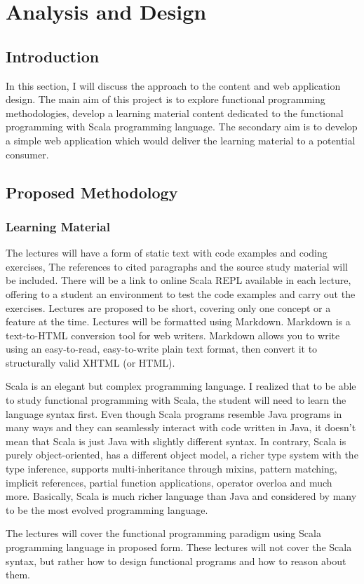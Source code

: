 \documentclass[12pt,twoside,a4paper]{report}
\begin{document}
\chapter{Analysis and Design}\label{3}

\section{Introduction}\label{3.1}
In this section, I will discuss the approach to the content and web application design. The main aim of this project is to explore functional programming methodologies, develop a learning material content dedicated to the functional programming with Scala programming language. The secondary aim is to develop a simple web application which would deliver the learning material to a potential consumer. 

\section{Proposed Methodology}\label{3.2}

\subsection{Learning Material}\label{3.2.1}
The lectures will have a form of static text with code examples and coding exercises, The references to cited paragraphs and the source study material will be included. There will be a link to online Scala REPL\cite{18} available in each lecture, offering to a student an environment to test the code examples and carry out the exercises. Lectures are proposed to be short, covering only one concept or a feature at the time. Lectures will be formatted using Markdown. Markdown is a text-to-HTML conversion tool for web writers. Markdown allows you to write using an easy-to-read, easy-to-write plain text format, then convert it to structurally valid XHTML (or HTML)\cite{20}.\par
Scala is an elegant but complex programming language. I realized that to be able to study functional programming with Scala, the student will need to learn the language syntax first. Even though Scala programs resemble Java programs in many ways and they can seamlessly interact with code written in Java\cite{17}, it doesn't mean that Scala is just Java with slightly different syntax. In contrary, Scala is purely object-oriented, has a different object model, a richer type system with the type inference, supports multi-inheritance through mixins, pattern matching, implicit references, partial function applications, operator overloa and much more. Basically, Scala is much richer language than Java and considered by many to be the most evolved programming language.\par
The lectures will cover the functional programming paradigm using Scala programming language in proposed form. These lectures will not cover the Scala syntax, but rather how to design functional programs and how to reason about them.
\end{document}
